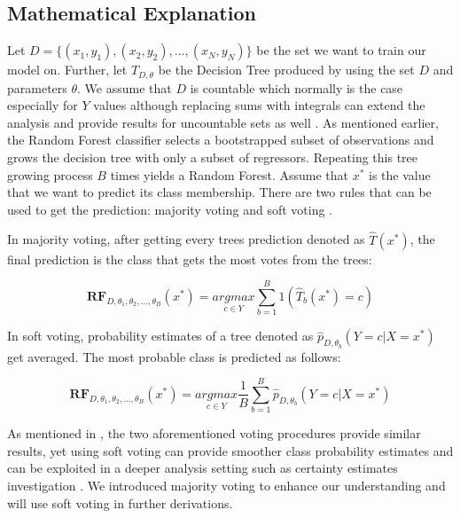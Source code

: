 \subsection{Mathematical Explanation}
Let $D = \{(x_{1},y_{1}), (x_{2}, y_{2}), ... , (x_{N}, y_{N})\}$ be the set we want to train our model on. 
Further, let $T_{D, \theta}$ be the Decision Tree produced by using the set $D$ 
and parameters $\theta$. We assume that $D$ is countable which normally is the 
case especially for $Y$ values although replacing sums with integrals can extend the analysis and 
provide results for uncountable sets as well \cite{kohavi1996bias}. As mentioned earlier, 
the Random Forest classifier selects a bootstrapped subset of observations and 
grows the decision tree with only a subset of regressors. Repeating this tree growing process $B$ times 
yields a Random Forest. Assume that $x^*$ is the value that we want to predict its class membership.
There are two rules that can be used to get the prediction:
majority voting and  soft voting \cite{louppe2014understanding}\cite{zhou2012ensemble}.

In majority voting, after getting every trees prediction denoted as $\hat{T}(x^*)$, 
the final prediction is the class that gets the most votes from the trees:

\begin{equation}
\boldsymbol{RF}_{D, \theta_{1}, \theta_{2}, ..., \theta_{B}} (x^*) =
	\underset{c \in Y}{argmax} \sum_{b = 1}^{B}{1(\hat{T}_{b}(x^*) = c)}
\end{equation}

In soft voting, probability estimates of a tree denoted as $\hat{p}_{D, \theta_{b}} (Y = c | X = x^*)$  get averaged.
The most probable class is predicted as follows:

\begin{equation}
\boldsymbol{RF}_{D, \theta_{1}, \theta_{2}, ..., \theta_{B}} (x^*) =
	\underset{c \in Y}{argmax} \dfrac{1}{B}\sum_{b = 1}^{B}{\hat{p}_{D, \theta_{b}} (Y = c | X = x^*)}
\end{equation}

As mentioned in \cite{breiman1996bagging}, the two aforementioned voting procedures provide similar results, 
yet using soft voting can provide smoother class probability estimates and can be exploited in a deeper analysis setting such as 
certainty estimates investigation \cite{louppe2014understanding}. 
We introduced majority voting to enhance our understanding and will use soft voting in further derivations. 


